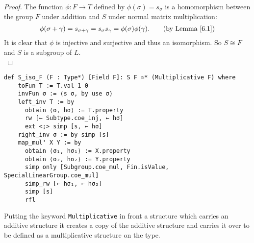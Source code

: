 \begin{proof}
\leanok
     The function $\phi: F \rightarrow T$ defined by $\phi(\sigma) = s_\sigma$ is a homomorphism between the group $F$ under addition and $S$ under normal matrix multiplication:
\begin{align*} \phi(\sigma + \gamma) = s_{\sigma + \gamma} = s_\sigma s_\gamma = \phi(\sigma) \phi(\gamma). \tag{by Lemma \ref{6.1}}
\end{align*}
It is clear that $\phi$ is injective and surjective and thus an isomorphism. So $ S \cong F$ and $S$ is a subgroup of $L$. \\
\end{proof}
\begin{footnotesize}
\begin{verbatim}
def S_iso_F (F : Type*) [Field F]: S F ≃* (Multiplicative F) where
    toFun T := T.val 1 0
    invFun σ := ⟨s σ, by use σ⟩
    left_inv T := by
      obtain ⟨σ, hσ⟩ := T.property
      rw [← Subtype.coe_inj, ← hσ]
      ext <;> simp [s, ← hσ]
    right_inv σ := by simp [s]
    map_mul' X Y := by
      obtain ⟨σ₁, hσ₁⟩ := X.property
      obtain ⟨σ₂, hσ₂⟩ := Y.property
      simp only [Subgroup.coe_mul, Fin.isValue, SpecialLinearGroup.coe_mul]
      simp_rw [← hσ₁, ← hσ₂]
      simp [s]
      rfl
\end{verbatim}
\end{footnotesize}

\begin{remark}[Multiplicative]
    Putting the keyword \texttt{Multiplicative} in front a structure which carries an additive structure
    it creates a copy of the additive structure and carries it over to be defined as a multiplicative structure
    on the type. 
\end{remark}


